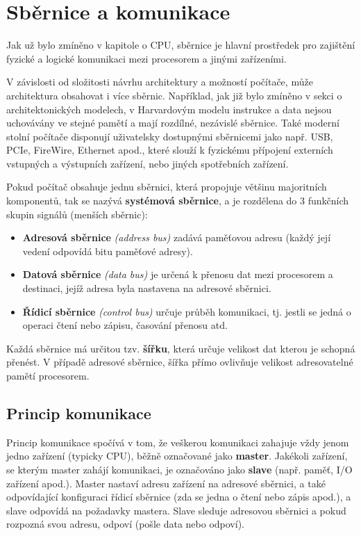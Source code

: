 \label{ch:tp-bus}
\chapter{Sběrnice a komunikace}

Jak už bylo zmíněno v kapitole o CPU, sběrnice je hlavní prostředek pro zajištění fyzické a logické
komunikaci mezi procesorem a jinými zařízeními.

V závislosti od složitosti návrhu architektury a možností počítače, může architektura obsahovat i
více sběrnic. Například, jak již bylo zmíněno v sekci o architektonických modelech, v Harvardovým
modelu instrukce a data nejsou uchovávány ve stejné pamětí a mají rozdílné, nezávislé sběrnice. Také
moderní stolní počítače disponují uživatelsky dostupnými sběrnicemi jako např. USB, PCIe, FireWire,
Ethernet apod., které slouží k fyzickému přípojení externích vstupných a výstupních zařízení, nebo
jiných spotřebních zařízení.

Pokud počítač obsahuje jednu sběrnici, která propojuje většinu majoritních komponentů, tak se nazývá
\textbf{systémová sběrnice}, a je rozdělena do 3 funkčních skupin signálů (menších sběrnic):

\begin{itemize}
    \item \textbf{Adresová sběrnice} \textit{(address bus)} zadává paměťovou
        adresu (každý její vedení odpovídá bitu paměťové adresy).
    \item \textbf{Datová sběrnice} \textit{(data bus)} je určená k přenosu dat mezi procesorem a
        destinaci, jejíž adresa byla nastavena na adresové sběrnici.
    \item \textbf{Řídicí sběrnice} \textit{(control bus)} určuje průběh komunikaci, tj. jestli se
        jedná o operaci čtení nebo zápisu, časování přenosu atd.
\end{itemize}

Každá sběrnice má určitou tzv. \textbf{šířku}, která určuje velikost dat kterou je schopná přenést.
V případě adresové sběrnice, šířka přímo ovlivňuje velikost adresovatelné pamětí procesorem.

\section{Princip komunikace}

Princip komunikace spočívá v tom, že veškerou komunikaci zahajuje vždy jenom jedno zařízení (typicky
CPU), běžně označované jako \textbf{master}. Jakékoli zařízení, se kterým master zahájí komunikaci,
je označováno jako \textbf{slave} (např. paměť, I/O zařízení apod.). Master nastaví adresu zařízení
na adresové sběrnici, a také odpovídající konfiguraci řídicí sběrnice (zda se jedna o čtení nebo
zápis apod.), a slave odpovídá na požadavky mastera. Slave sleduje adresovou sběrnici a pokud
rozpozná svou adresu, odpoví (pošle data nebo odpoví).

